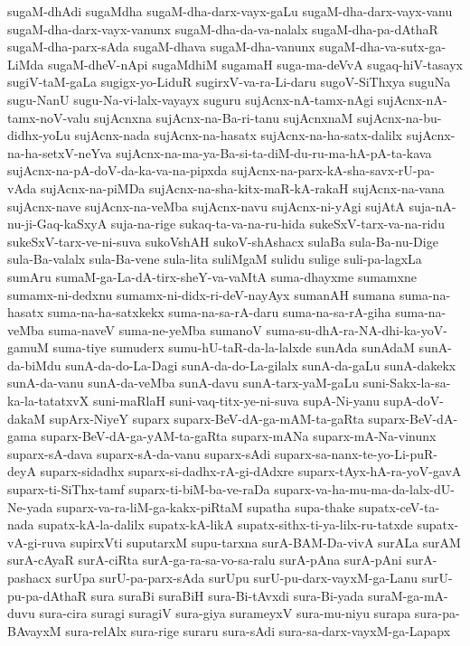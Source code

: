 {sugaM-dhAdi
sugaMdha
sugaM-dha-darx-vayx-gaLu
sugaM-dha-darx-vayx-vanu
sugaM-dha-darx-vayx-vanunx
sugaM-dha-da-va-nalalx
sugaM-dha-pa-dAthaR
sugaM-dha-parx-sAda
sugaM-dhava
sugaM-dha-vanunx
sugaM-dha-va-sutx-ga-LiMda
sugaM-dheV-nApi
sugaMdhiM
sugamaH
suga-ma-deVvA
sugaq-hiV-tasayx
sugiV-taM-gaLa
sugigx-yo-LiduR
sugirxV-va-ra-Li-daru
sugoV-SiThxya
suguNa
sugu-NanU
sugu-Na-vi-lalx-vayayx
suguru
sujAcnx-nA-tamx-nAgi
sujAcnx-nA-tamx-noV-valu
sujAcnxna
sujAcnx-na-Ba-ri-tanu
sujAcnxnaM
sujAcnx-na-bu-didhx-yoLu
sujAcnx-nada
sujAcnx-na-hasatx
sujAcnx-na-ha-satx-dalilx
sujAcnx-na-ha-setxV-neYva
sujAcnx-na-ma-ya-Ba-si-ta-diM-du-ru-ma-hA-pA-ta-kava
sujAcnx-na-pA-doV-da-ka-va-na-pipxda
sujAcnx-na-parx-kA-sha-savx-rU-pa-vAda
sujAcnx-na-piMDa
sujAcnx-na-sha-kitx-maR-kA-rakaH
sujAcnx-na-vana
sujAcnx-nave
sujAcnx-na-veMba
sujAcnx-navu
sujAcnx-ni-yAgi
sujAtA
suja-nA-nu-ji-Gaq-kaSxyA
suja-na-rige
sukaq-ta-va-na-ru-hida
sukeSxV-tarx-va-na-ridu
sukeSxV-tarx-ve-ni-suva
sukoVshAH
sukoV-shAshacx
sulaBa
sula-Ba-nu-Dige
sula-Ba-valalx
sula-Ba-vene
sula-lita
suliMgaM
sulidu
sulige
suli-pa-lagxLa
sumAru
sumaM-ga-La-dA-tirx-sheY-va-vaMtA
suma-dhayxme
sumamxne
sumamx-ni-dedxnu
sumamx-ni-didx-ri-deV-nayAyx
sumanAH
sumana
suma-na-hasatx
suma-na-ha-satxkekx
suma-na-sa-rA-daru
suma-na-sa-rA-giha
suma-na-veMba
suma-naveV
suma-ne-yeMba
sumanoV
suma-su-dhA-ra-NA-dhi-ka-yoV-gamuM
suma-tiye
sumuderx
sumu-hU-taR-da-la-lalxde
sunAda
sunAdaM
sunA-da-biMdu
sunA-da-do-La-Dagi
sunA-da-do-La-gilalx
sunA-da-gaLu
sunA-dakekx
sunA-da-vanu
sunA-da-veMba
sunA-davu
sunA-tarx-yaM-gaLu
suni-Sakx-la-sa-ka-la-tatatxvX
suni-maRlaH
suni-vaq-titx-ye-ni-suva
supA-Ni-yanu
supA-doV-dakaM
supArx-NiyeY
suparx
suparx-BeV-dA-ga-mAM-ta-gaRta
suparx-BeV-dA-gama
suparx-BeV-dA-ga-yAM-ta-gaRta
suparx-mANa
suparx-mA-Na-vinunx
suparx-sA-dava
suparx-sA-da-vanu
suparx-sAdi
suparx-sa-nanx-te-yo-Li-puR-deyA
suparx-sidadhx
suparx-si-dadhx-rA-gi-dAdxre
suparx-tAyx-hA-ra-yoV-gavA
suparx-ti-SiThx-tamf
suparx-ti-biM-ba-ve-raDa
suparx-va-ha-mu-ma-da-lalx-dU-Ne-yada
suparx-va-ra-liM-ga-kakx-piRtaM
supatha
supa-thake
supatx-ceV-ta-nada
supatx-kA-la-dalilx
supatx-kA-likA
supatx-sithx-ti-ya-lilx-ru-tatxde
supatx-vA-gi-ruva
supirxVti
suputarxM
supu-tarxna
surA-BAM-Da-vivA
surALa
surAM
surA-cAyaR
surA-ciRta
surA-ga-ra-sa-vo-sa-ralu
surA-pAna
surA-pAni
surA-pashacx
surUpa
surU-pa-parx-sAda
surUpu
surU-pu-darx-vayxM-ga-Lanu
surU-pu-pa-dAthaR
sura
suraBi
suraBiH
sura-Bi-tAvxdi
sura-Bi-yada
suraM-ga-mA-duvu
sura-cira
suragi
suragiV
sura-giya
surameyxV
sura-mu-niyu
surapa
sura-pa-BAvayxM
sura-relAlx
sura-rige
suraru
sura-sAdi
sura-sa-darx-vayxM-ga-Lapapx
}
